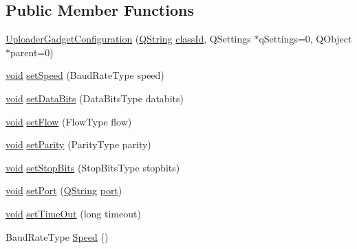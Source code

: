 \subsection*{\-Public \-Member \-Functions}
\begin{DoxyCompactItemize}
\item 
\hyperlink{group___y_modem_uploader_ga1c78df01d106cba6d5b3cb6103df5588}{\-Uploader\-Gadget\-Configuration} (\hyperlink{group___u_a_v_objects_plugin_gab9d252f49c333c94a72f97ce3105a32d}{\-Q\-String} \hyperlink{group___core_plugin_gac953657221ba7fda967ada0408332641}{class\-Id}, \-Q\-Settings $\ast$q\-Settings=0, \-Q\-Object $\ast$parent=0)
\item 
\hyperlink{group___u_a_v_objects_plugin_ga444cf2ff3f0ecbe028adce838d373f5c}{void} \hyperlink{group___y_modem_uploader_ga44c9e2b2f4fc691f67440a125a0d3466}{set\-Speed} (\-Baud\-Rate\-Type speed)
\item 
\hyperlink{group___u_a_v_objects_plugin_ga444cf2ff3f0ecbe028adce838d373f5c}{void} \hyperlink{group___y_modem_uploader_ga1da0d34ca3a5840687f53cdb4da50992}{set\-Data\-Bits} (\-Data\-Bits\-Type databits)
\item 
\hyperlink{group___u_a_v_objects_plugin_ga444cf2ff3f0ecbe028adce838d373f5c}{void} \hyperlink{group___y_modem_uploader_ga69e8d13e1ed2fc41872ecf7c5447aa8b}{set\-Flow} (\-Flow\-Type flow)
\item 
\hyperlink{group___u_a_v_objects_plugin_ga444cf2ff3f0ecbe028adce838d373f5c}{void} \hyperlink{group___y_modem_uploader_ga842e10f0bd593c16293486664f0892bd}{set\-Parity} (\-Parity\-Type parity)
\item 
\hyperlink{group___u_a_v_objects_plugin_ga444cf2ff3f0ecbe028adce838d373f5c}{void} \hyperlink{group___y_modem_uploader_ga4207c9c91330ae30a22867c428ade5e5}{set\-Stop\-Bits} (\-Stop\-Bits\-Type stopbits)
\item 
\hyperlink{group___u_a_v_objects_plugin_ga444cf2ff3f0ecbe028adce838d373f5c}{void} \hyperlink{group___y_modem_uploader_gae74e20b5d71cdb225b581729bda7ef38}{set\-Port} (\hyperlink{group___u_a_v_objects_plugin_gab9d252f49c333c94a72f97ce3105a32d}{\-Q\-String} \hyperlink{classport}{port})
\item 
\hyperlink{group___u_a_v_objects_plugin_ga444cf2ff3f0ecbe028adce838d373f5c}{void} \hyperlink{group___y_modem_uploader_ga4d3805496006d3cfdd8d1665d2b11654}{set\-Time\-Out} (long timeout)
\item 
\-Baud\-Rate\-Type \hyperlink{group___y_modem_uploader_ga3cd2d8faf40a9fcb60022843bf36171d}{\-Speed} ()
\item 

\end{DoxyCompactItemize}
